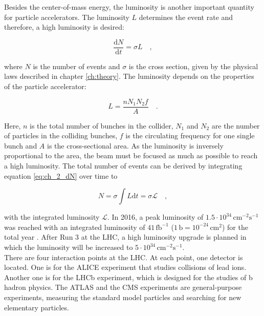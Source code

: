Besides the center-of-mass energy, the luminosity is another important quantity for particle accelerators. The luminosity $L$ determines the event rate and therefore, a high luminosity is desired: 

\begin{equation}
\frac{\mathrm{d}N}{\mathrm{d}t} = \sigma L \quad ,
\end{equation}\label{eq:ch_2_dN}

where $N$ is the number of events and $\sigma$ is the cross section, given by the physical laws described in chapter \ref{ch:theory}. The luminosity depends on the properties of the particle accelerator:

\begin{equation}
L = \frac{n  N_1  N_2  f}{A} \quad .
\end{equation}\label{eq:ch_2_L}

Here, $n$ is the total number of bunches in the collider, $N_1$ and $N_2$ are the number of particles in the colliding bunches, $f$ is the circulating frequency for one single bunch and $A$ is the cross-sectional area. As the luminosity is inversely proportional to the area, the beam must be focused as much as possible to reach a high luminosity. The total number of events can be derived by integrating equation \ref{eq:ch_2_dN} over time to

\begin{equation}
N = \sigma \int L \textrm{d}t = \sigma \mathcal{L} \quad ,
\end{equation}

with the integrated luminosity $\mathcal{L}$. In 2016, a peak luminosity of $1.5 \cdot 10^{34}\,\textrm{cm}^{-2}\textrm{s}^{-1}$ was reached with an integrated luminosity of $41\,\textrm{fb}^{-1}$ ($1\,\textrm{b} = 10^{-24}\,\textrm{cm}^2$) for the total year \cite{lhclumi2016}. After Run 3 at the LHC, a high luminosity upgrade is planned in which the luminosity will be increased to $5 \cdot 10^{34}\,\textrm{cm}^{-2}\textrm{s}^{-1}$.\\

There are four interaction points at the LHC. At each point, one detector is located. One is for the ALICE experiment that studies collisions of lead ions. Another one is for the LHCb experiment, which is designed for the studies of b hadron physics. The ATLAS and the CMS experiments are general-purpose experiments, measuring the standard model particles and searching for new elementary particles.



